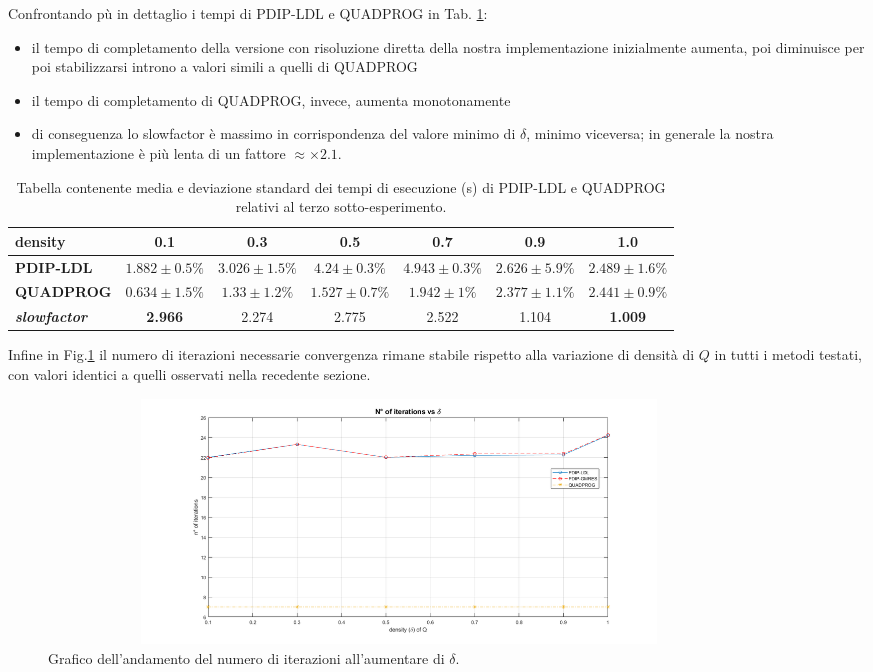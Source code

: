 Confrontando pù in dettaglio i tempi di PDIP-LDL e QUADPROG in Tab. \ref{tab:ldlqp3}:
 \begin{itemize}
     \item il tempo di completamento della versione con risoluzione diretta della nostra implementazione inizialmente aumenta, poi diminuisce per poi stabilizzarsi introno a valori simili a quelli di QUADPROG
     \item il tempo di completamento di QUADPROG, invece, aumenta monotonamente
     \item di conseguenza lo slowfactor è massimo in corrispondenza del valore minimo di $\delta$, minimo viceversa; in generale la nostra implementazione è più lenta di un fattore $\approx \times2.1$.
 \end{itemize}
\begin{table}[!h]
\centering
\begin{tabular}{l|c|c|c|c|c|c}
\textbf{density}                     & \textbf{0.1} & \textbf{0.3} & \textbf{0.5} & \textbf{0.7} & \textbf{0.9} & \textbf{1.0} \\ \hline
\textbf{PDIP-LDL}                    & $1.882 \pm 0.5\%$       & $3.026 \pm 1.5\%$       & $4.24  \pm 0.3\%$       & $4.943 \pm 0.3\%$       & $2.626 \pm 5.9\%$       & $2.489  \pm 1.6\%$       \\
\textbf{QUADPROG}                    & $0.634  \pm 1.5\%$      & $1.33  \pm 1.2\%$       & $1.527 \pm 0.7\%$       & $1.942 \pm 1\%$       & $2.377 \pm 1.1\%$       & $2.441 \pm 0.9\%$       \\
\textbf{\textit{slowfactor}} & \textbf{2.966}       & 2.274       & 2.775       & 2.522       & 1.104       & \textbf{1.009}
\end{tabular}
\caption{Tabella contenente media e deviazione standard dei tempi di esecuzione (s) di PDIP-LDL e QUADPROG relativi al terzo sotto-esperimento. \label{tab:ldlqp3}}
\end{table}

 Infine in Fig.\ref{fig:exp3.2} il numero di iterazioni necessarie convergenza rimane stabile rispetto alla variazione di densità di $Q$ in tutti i metodi testati, con valori identici a quelli osservati nella recedente sezione. 
 

\begin{figure}[!h]
    \centering
    \includegraphics[width=0.9\textwidth, height = 6.5cm]{img/MU9.png}
    \caption{Grafico dell'andamento del numero di iterazioni all'aumentare di $\delta$. \label{fig:exp3.2}}
\end{figure}

